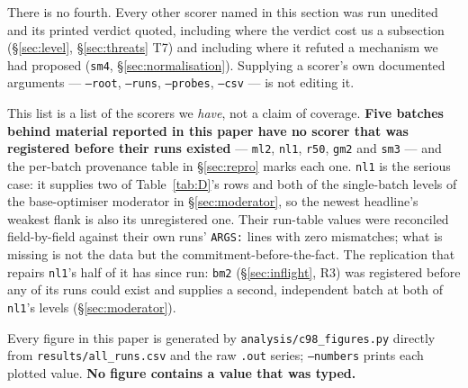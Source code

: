 \documentclass[10pt,letterpaper]{article}
\newcommand{\arm}[1]{\texttt{#1}}
\begin{document}
There is no fourth. Every other scorer named in this section was run unedited and its printed
verdict quoted, including where the verdict cost us a subsection (\S\ref{sec:level},
\S\ref{sec:threats} T7) and including where it refuted a mechanism we had proposed (\arm{sm4},
\S\ref{sec:normalisation}). Supplying a scorer's own documented arguments --- \texttt{--root},
\texttt{--runs}, \texttt{--probes}, \texttt{--csv} --- is not editing it.

This list is a list of the scorers we \emph{have}, not a claim of coverage. \textbf{Five batches
behind material reported in this paper have no scorer that was registered before their runs
existed} --- \arm{ml2}, \arm{nl1}, \arm{r50}, \arm{gm2} and \arm{sm3} --- and the per-batch
provenance table in \S\ref{sec:repro} marks each one. \arm{nl1} is the serious case: it supplies
two of Table~\ref{tab:D}'s rows and both of the single-batch levels of the base-optimiser
moderator in \S\ref{sec:moderator}, so the newest headline's weakest flank is also its
unregistered one. Their run-table values were reconciled field-by-field against their own runs'
\texttt{ARGS:} lines with zero mismatches; what is missing is not the data but the
commitment-before-the-fact. The replication that repairs \arm{nl1}'s half of it has since run:
\arm{bm2} (\S\ref{sec:inflight}, R3) was registered before any of its runs could exist and
supplies a second, independent batch at both of \arm{nl1}'s levels (\S\ref{sec:moderator}).

Every figure in this paper is generated by \texttt{analysis/c98\_figures.py} directly from
\texttt{results/all\_runs.csv} and the raw \texttt{.out} series; \texttt{--numbers} prints each
plotted value. \textbf{No figure contains a value that was typed.}
\end{document}
